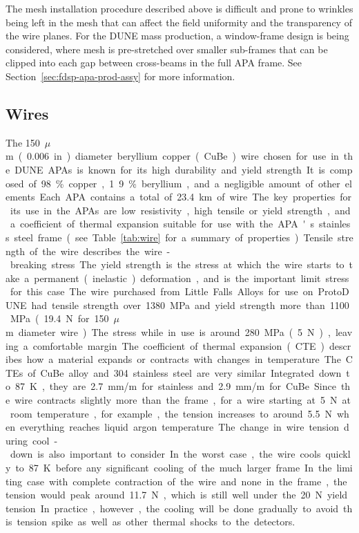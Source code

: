The mesh installation procedure described above is difficult and prone to wrinkles being left in the mesh that can affect the field uniformity and the transparency of the wire planes. For the DUNE mass production, a window-frame design is being considered, where mesh is pre-stretched over smaller sub-frames that can be clipped into each gap between cross-beams in the full APA frame.  See Section~\ref{sec:fdsp-apa-prod-assy} for more information.


\subsection{Wires}
\label{sec:fdsp-apa-wires}

The \SI{150}{$\mu$m} (\SI{.006}{in}.) diameter beryllium copper (CuBe) wire chosen for use in the DUNE APAs is known for its high durability and yield strength. It is composed of 98\% copper, 1.9\% beryllium, and a negligible amount of other elements. Each APA contains a total of \SI{23.4}{km} of wire.  

The key properties for its use in the APAs are low resistivity, high tensile or yield strength, and a coefficient of thermal expansion suitable for use with the APA's stainless steel frame (see Table~\ref{tab:wire} for a summary of properties).  Tensile strength of the wire describes the wire-breaking stress.  The yield strength is the stress at which the wire starts to take a permanent (inelastic) deformation, and is the important limit stress for this case.  The wire purchased from Little Falls Alloys for use on ProtoDUNE had tensile strength over \SI{1380}{MPa} and yield strength more than \SI{1100}{MPa} (\SI{19.4}{N} for \SI{150}{$\mu$m} diameter wire).  The stress while in use is around \SI{280}{MPa} (\SI{5}{N}), leaving a comfortable margin.

The coefficient of thermal expansion (CTE) describes how a material expands or contracts with changes in temperature.  The CTEs of CuBe alloy and 304 stainless steel are very similar.  Integrated down to \SI{87}{K}, they are \SI{2.7}{mm/m} for stainless and \SI{2.9}{mm/m} for CuBe. Since the wire contracts slightly more than the frame, for a wire starting at \SI{5}{N} at room temperature, for example, the tension increases to around \SI{5.5}{N} when everything reaches liquid argon temperature.  

The change in wire tension during cool-down is also important to consider.  In the worst case, the wire cools quickly to \SI{87}{K} before any significant cooling of the much larger frame.  In the limiting case with complete contraction of the wire and none in the frame, the tension would peak around \SI{11.7}{N}, which is still well under the \SI{20}{N} yield tension. In practice, however, the cooling will be done gradually to avoid this tension spike as well as other thermal shocks to the detectors.

